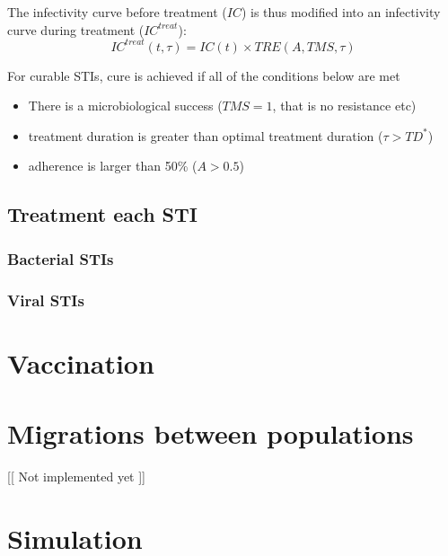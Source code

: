 \documentclass[11pt, onecolumn]{article}
\begin{document}
The infectivity curve before treatment ($IC$) is thus modified into an infectivity curve during treatment ($IC^{treat}$):
$$IC^{treat}(t,\tau)= IC(t)\times TRE(A,TMS,\tau)  $$

For curable STIs, cure is achieved if all of the conditions below are met
\begin{itemize}
\item There is a microbiological success ($TMS=1$, that is no resistance etc)
\item treatment duration is greater than optimal treatment duration ($\tau>TD^*$)
\item adherence is larger than 50\% ($A>0.5$) 
\end{itemize}


\subsection{Treatment each STI}

\subsubsection{Bacterial STIs}
\subsubsection{Viral STIs}




\section{Vaccination}







\section{Migrations between populations}
[[ Not implemented yet ]]



\section{Simulation}
\end{document}
